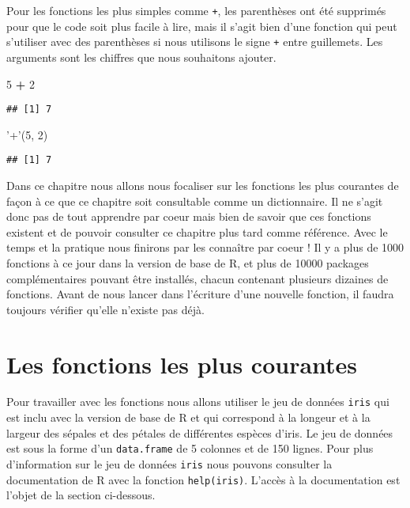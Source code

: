 \documentclass[]{book}
\newenvironment{Shaded}{\begin{snugshade}}{\end{snugshade}}
\newcommand{\DecValTok}[1]{\textcolor[rgb]{0.00,0.00,0.81}{#1}}
\newcommand{\StringTok}[1]{\textcolor[rgb]{0.31,0.60,0.02}{#1}}
\newcommand{\OperatorTok}[1]{\textcolor[rgb]{0.81,0.36,0.00}{\textbf{#1}}}
\newcommand{\NormalTok}[1]{#1}
\theoremstyle{definition}
\theoremstyle{definition}
\theoremstyle{definition}
\theoremstyle{remark}
\begin{document}
Pour les fonctions les plus simples comme \texttt{+}, les parenthèses
ont été supprimés pour que le code soit plus facile à lire, mais il
s'agit bien d'une fonction qui peut s'utiliser avec des parenthèses si
nous utilisons le signe \texttt{+} entre guillemets. Les arguments sont
les chiffres que nous souhaitons ajouter.

\begin{Shaded}
\begin{Highlighting}[]
\DecValTok{5} \OperatorTok{+}\StringTok{ }\DecValTok{2}
\end{Highlighting}
\end{Shaded}

\begin{verbatim}
## [1] 7
\end{verbatim}

\begin{Shaded}
\begin{Highlighting}[]
\StringTok{'+'}\NormalTok{(}\DecValTok{5}\NormalTok{, }\DecValTok{2}\NormalTok{)}
\end{Highlighting}
\end{Shaded}

\begin{verbatim}
## [1] 7
\end{verbatim}

Dans ce chapitre nous allons nous focaliser sur les fonctions les plus
courantes de façon à ce que ce chapitre soit consultable comme un
dictionnaire. Il ne s'agit donc pas de tout apprendre par coeur mais
bien de savoir que ces fonctions existent et de pouvoir consulter ce
chapitre plus tard comme référence. Avec le temps et la pratique nous
finirons par les connaître par coeur ! Il y a plus de 1000 fonctions à
ce jour dans la version de base de R, et plus de 10000 packages
complémentaires pouvant être installés, chacun contenant plusieurs
dizaines de fonctions. Avant de nous lancer dans l'écriture d'une
nouvelle fonction, il faudra toujours vérifier qu'elle n'existe pas
déjà.

\hypertarget{l015mainfun}{\section{Les fonctions les plus
courantes}\label{l015mainfun}}

Pour travailler avec les fonctions nous allons utiliser le jeu de
données \texttt{iris} qui est inclu avec la version de base de R et qui
correspond à la longeur et à la largeur des sépales et des pétales de
différentes espèces d'iris. Le jeu de données est sous la forme d'un
\texttt{data.frame} de 5 colonnes et de 150 lignes. Pour plus
d'information sur le jeu de données \texttt{iris} nous pouvons consulter
la documentation de R avec la fonction \texttt{help(iris)}. L'accès à la
documentation est l'objet de la section ci-dessous.
\end{document}
